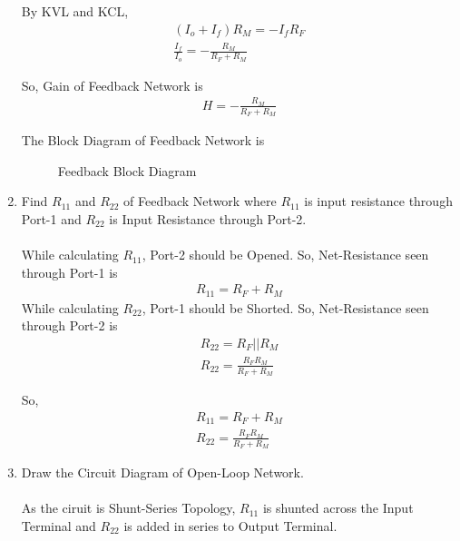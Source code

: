 \begin{enumerate}[label=\thesubsection.\arabic*.,ref=\thesubsection.\theenumi]
By KVL and KCL,
\begin{align}
(I_{o} + I_{f})R_{M} = -I_{f}R_{F}\\
\frac{I_{f}}{I_{o}} = -\frac{R_{M}}{R_{F}+R_{M}}
\end{align}

So, Gain of Feedback Network is
\begin{align}
H = -\frac{R_{M}}{R_{F}+R_{M}}
\end{align}

The Block Diagram of Feedback Network is
\begin{figure}[ht!]
	\begin{center}
		\resizebox{\columnwidth}{!}{}
	\end{center}
	\caption{Feedback Block Diagram}
	\label{fig:Feedback_Block}
\end{figure}

\item Find $R_{11}$ and $R_{22}$  of Feedback Network where $R_{11}$ is input resistance through Port-1 and $R_{22}$ is Input Resistance through Port-2.\\
\solution\\
While calculating $R_{11}$, Port-2 should be Opened. So, Net-Resistance seen through Port-1 is 
\begin{align}
R_{11} = R_{F} + R_{M}
\end{align}
While calculating $R_{22}$, Port-1 should be Shorted. So, Net-Resistance seen through Port-2 is 
\begin{align}
R_{22} = R_{F} || R_{M}\\
R_{22} = \frac{R_{F}R_{M}}{R_{F}+R_{M}}
\end{align}

So,
\begin{align}
R_{11} = R_{F} + R_{M}\\
R_{22} = \frac{R_{F}R_{M}}{R_{F}+R_{M}}
\end{align}

\begin{table}[!ht]
\centering

\caption{}
\label{table:table1}
\end{table}

\item Draw the Circuit Diagram of Open-Loop Network.\\
\solution\\
As the ciruit is Shunt-Series Topology, $R_{11}$ is shunted across the Input Terminal and $R_{22}$ is added in series to Output Terminal.


\end{enumerate}
